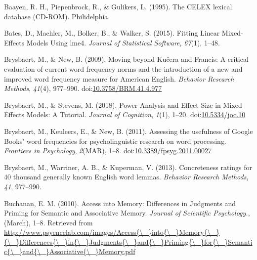 \documentclass[english,man]{apa6}
\theoremstyle{definition}
\theoremstyle{definition}
\theoremstyle{definition}
\theoremstyle{remark}
\begin{document}
\hypertarget{ref-Baayen1995}{}
Baayen, R. H., Piepenbrock, R., \& Gulikers, L. (1995). The CELEX
lexical database (CD-ROM). Philidelphia.

\hypertarget{ref-Bates2015}{}
Bates, D., Machler, M., Bolker, B., \& Walker, S. (2015). Fitting Linear
Mixed-Effects Models Using lme4. \emph{Journal of Statistical Software},
\emph{67}(1), 1--48.

\hypertarget{ref-Brysbaert2009}{}
Brysbaert, M., \& New, B. (2009). Moving beyond Kučera and Francis: A
critical evaluation of current word frequency norms and the introduction
of a new and improved word frequency measure for American English.
\emph{Behavior Research Methods}, \emph{41}(4), 977--990.
doi:\href{https://doi.org/10.3758/BRM.41.4.977}{10.3758/BRM.41.4.977}

\hypertarget{ref-Brysbaert2018}{}
Brysbaert, M., \& Stevens, M. (2018). Power Analysis and Effect Size in
Mixed Effects Models: A Tutorial. \emph{Journal of Cognition},
\emph{1}(1), 1--20.
doi:\href{https://doi.org/10.5334/joc.10}{10.5334/joc.10}

\hypertarget{ref-Brysbaert2011}{}
Brysbaert, M., Keuleers, E., \& New, B. (2011). Assessing the usefulness
of Google Books' word frequencies for psycholinguistic research on word
processing. \emph{Frontiers in Psychology}, \emph{2}(MAR), 1--8.
doi:\href{https://doi.org/10.3389/fpsyg.2011.00027}{10.3389/fpsyg.2011.00027}

\hypertarget{ref-Brysbaert2013}{}
Brysbaert, M., Warriner, A. B., \& Kuperman, V. (2013). Concreteness
ratings for 40 thousand generally known English word lemmas.
\emph{Behavior Research Methods}, \emph{41}, 977--990.

\hypertarget{ref-Buchanan2010}{}
Buchanan, E. M. (2010). Access into Memory: Differences in Judgments and
Priming for Semantic and Associative Memory. \emph{Journal of Scientific
Psychology.}, (March), 1--8. Retrieved from
\href{http://www.psyencelab.com/images/Access\%7B/_\%7Dinto\%7B/_\%7DMemory\%7B/_\%7D\%7B/_\%7DDifferences\%7B/_\%7Din\%7B/_\%7DJudgments\%7B/_\%7Dand\%7B/_\%7DPriming\%7B/_\%7Dfor\%7B/_\%7DSemantic\%7B/_\%7Dand\%7B/_\%7DAssociative\%7B/_\%7DMemory.pdf}{http://www.psyencelab.com/images/Access\{\textbackslash{}\_\}into\{\textbackslash{}\_\}Memory\{\textbackslash{}\_\}\{\textbackslash{}\_\}Differences\{\textbackslash{}\_\}in\{\textbackslash{}\_\}Judgments\{\textbackslash{}\_\}and\{\textbackslash{}\_\}Priming\{\textbackslash{}\_\}for\{\textbackslash{}\_\}Semantic\{\textbackslash{}\_\}and\{\textbackslash{}\_\}Associative\{\textbackslash{}\_\}Memory.pdf}
\end{document}
